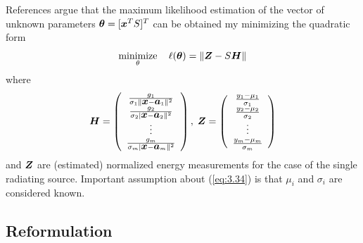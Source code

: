 References \cite{LiHu,ShengHu} argue that the maximum likelihood estimation of the vector of unknown parameters $\mbox{\boldmath${\theta}$} = [\mbox{\boldmath$x$}^T S]^T$ can be obtained my minimizing the quadratic form
\begin{equation} \label{eq:3.34}
\mathop{\mbox{minimize}}_\theta \quad \ell(\mbox{\boldmath${\theta}$}) = \|\mbox{\boldmath$Z$} - S\mbox{\boldmath$H$}\|
\end{equation}
where 
\begin{equation}
\nonumber
\mbox{\boldmath$H$} = \left( \begin{array}{c}
\frac{g_1}{\sigma_1\|\mbox{\boldmath$x$} - \mbox{\boldmath$a$}_1 \|^2} \\
\frac{g_2}{\sigma_2|\mbox{\boldmath$x$} - \mbox{\boldmath$a$}_2 \|^2} \\
\vdots \\
\frac{g_m}{\sigma_m|\mbox{\boldmath$x$} - \mbox{\boldmath$a$}_m \|^2} \\
\end{array}
\right) , \;
\nonumber
\mbox{\boldmath$Z$} = \left( \begin{array}{c}
\frac{y_1 - \mu_1}{\sigma_1} \\
\frac{y_2 - \mu_2}{\sigma_2} \\
\vdots \\
\frac{y_m - \mu_m}{\sigma_m} \\
\end{array}
\right)
\end{equation}
and $\mbox{\boldmath$Z$}$ are (estimated) normalized energy measurements for the case of the single radiating source. Important assumption about (\ref{eq:3.34}) is that $\mu_i$ and $\sigma_i$ are considered known. 


\subsection{Reformulation}

